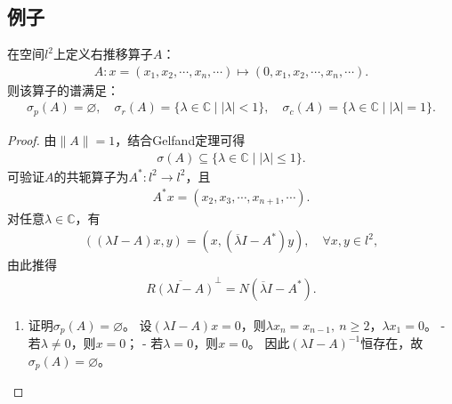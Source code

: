 \documentclass[../../main.tex]{subfiles}%
\begin{document}
\subsection{例子}

\begin{example}
在空间$l^2$上定义右推移算子$A$：
\begin{align*}
A:x=(x_1,x_2,\cdots,x_n,\cdots)\mapsto(0,x_1,x_2,\cdots,x_n,\cdots).
\end{align*}
则该算子的谱满足：
\begin{align*}
\sigma_p(A)=\varnothing ,\quad \sigma_r(A)=\{\lambda\in\mathbb{C}\mid|\lambda|<1\},\quad \sigma_c(A)=\{\lambda\in\mathbb{C}\mid|\lambda|=1\}.
\end{align*}
\end{example}
\begin{proof}

由$\|A\|=1$，结合Gelfand定理可得
\begin{align*}
\sigma(A)\subseteq\{\lambda\in\mathbb{C}\mid|\lambda|\leqslant1\}.
\end{align*}
可验证$A$的共轭算子为$A^*:l^2\to l^2$，且
\begin{align*}
A^*x=(x_2,x_3,\cdots,x_{n+1},\cdots).
\end{align*}
对任意$\lambda\in\mathbb{C}$，有
\begin{align*}
((\lambda I-A)x,y)=(x,(\overline{\lambda}I-A^*)y),\quad \forall x,y\in l^2,
\end{align*}
由此推得
\begin{align*}
\overline{R(\lambda I-A)}^{\perp}=N(\overline{\lambda}I-A^*).
\end{align*}
\begin{enumerate}[(1)]
\item 证明$\sigma_p(A)=\varnothing $。
设$(\lambda I-A)x=0$，则$\lambda x_n=x_{n-1},\ n\geqslant2$，$\lambda x_1=0$。
- 若$\lambda\neq0$，则$x=0$；
- 若$\lambda=0$，则$x=0$。
因此$(\lambda I-A)^{-1}$恒存在，故$\sigma_p(A)=\varnothing $。


\end{enumerate}
\end{proof}
\end{document}
